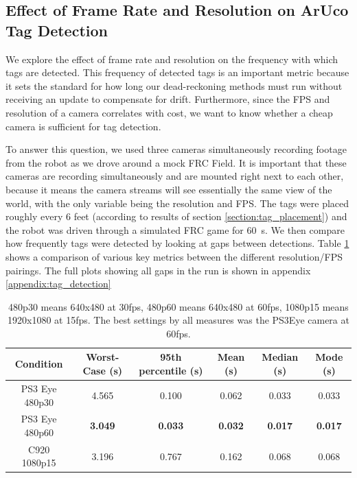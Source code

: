 \documentclass{article}
\begin{document}
  \subsection{Effect of Frame Rate and Resolution on ArUco Tag Detection} \label{section:fps}

    We explore the effect of frame rate and resolution on the frequency with which tags are detected. This frequency of detected tags is an important metric because it sets the standard for how long our dead-reckoning methods must run without receiving an update to compensate for drift. Furthermore, since the FPS and resolution of a camera correlates with cost, we want to know whether a cheap camera is sufficient for tag detection.

    To answer this question, we used three cameras simultaneously recording footage from the robot as we drove around a mock FRC Field. It is important that these cameras are recording simultaneously and are mounted right next to each other, because it means the camera streams will see essentially the same view of the world, with the only variable being the resolution and FPS. The tags were placed roughly every 6 feet (according to results of section \ref{section:tag_placement}) and the robot was driven through a simulated FRC game for \SI{60}{\second}. We then compare how frequently tags were detected by looking at gaps between detections. Table \ref{table:tag_detection_comparison} shows a comparison of various key metrics between the different resolution/FPS pairings. The full plots showing all gaps in the run is shown in appendix \ref{appendix:tag_detection}

    \begin{table}[H]
      \centering
      \begin{tabular}{|c|c|c|c|c|c|} \hline
        Condition & Worst-Case (s) & 95th percentile (s) & Mean (s) & Median (s) & Mode (s) \\ \hline
        PS3 Eye 480p30 & 4.565 & 0.100 & 0.062 & 0.033 & 0.033 \\ \hline
        PS3 Eye 480p60 & \textbf{3.049} & \textbf{0.033} & \textbf{0.032} & \textbf{0.017} & \textbf{0.017} \\ \hline
        C920 1080p15 & 3.196 & 0.767 & 0.162 & 0.068 & 0.068 \\ \hline
      \end{tabular}
      \caption{480p30 means 640x480 at 30fps, 480p60 means 640x480 at 60fps, 1080p15 means 1920x1080 at 15fps. The best settings by all measures was the PS3Eye camera at 60fps.}
      \label{table:tag_detection_comparison}
    \end{table}
\end{document}
